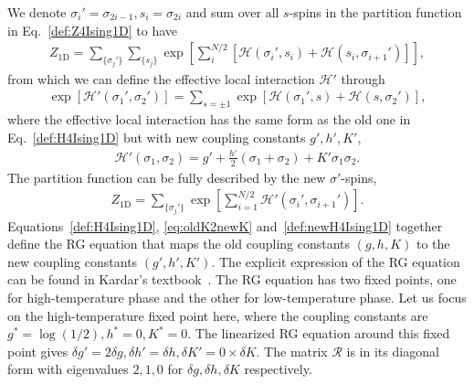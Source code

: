 \documentclass[aps,prb,reprint,superscriptaddress,floatfix]{revtex4-2}
\begin{document}
We denote $\sigma_i'=\sigma_{2i-1}, s_i = \sigma_{2i}$ and sum over all $s$-spins in the partition function in Eq.~\eqref{def:Z4Ising1D} to have
%
\begin{align}\label{eq:oldK2newKZ}
    Z_{\text{1D}} = 
    \sum_{\{\sigma_j'\}} \sum_{\{s_j \}}
    \exp{\left[ \sum_i^{N/2} \left[\mathscr{H}\left(\sigma_i',s_i\right)
    + \mathscr{H}\left(s_i,\sigma_{i+1}'\right)\right]\right]},
\end{align}
%
from which we can define the effective local interaction $\mathscr{H}'$ through
%
\begin{align}\label{eq:oldK2newK}
    \exp{\left[\mathscr{H}'\left(\sigma_1',\sigma_2'\right)\right]} =
    \sum_{s=\pm 1}\exp{\left[\mathscr{H}\left(\sigma_1',s\right) +
        \mathscr{H}\left(s,\sigma_2'\right)\right]},
\end{align}
%
where the effective local interaction has the same form as the old one in Eq.~\eqref{def:H4Ising1D} but with new coupling constants $g',h',K'$,
%
\begin{align}\label{def:newH4Ising1D}
    \mathscr{H}'\left(\sigma_1,\sigma_2\right) = g' +
    \frac{h'}{2}\left(\sigma_1 + \sigma_2\right) + K' \sigma_1 \sigma_2.
\end{align}
%
The partition function can be fully described by the new $\sigma'$-spins,
%
\begin{align}\label{eq:Z2Ising1Dnew}
    Z_{\text{1D}} = \sum_{\{\sigma_j'\}}
    \exp{\left[\sum_{i=1}^{N/2}\mathscr{H}'\left(\sigma_i',\sigma_{i+1}'\right)\right]}.
\end{align}
%
Equations~\eqref{def:H4Ising1D}, \eqref{eq:oldK2newK} and~\eqref{def:newH4Ising1D} together define the RG equation that maps the old coupling constants $(g,h,K)$ to the new coupling constants $(g',h',K')$. 
The explicit expression of the RG equation can be found in Kardar's textbook~\cite{kardar2007}. 
The RG equation has two fixed points, one for high-temperature phase and the other for low-temperature phase. 
Let us focus on the high-temperature fixed point here, where the coupling constants are $g^* = \log\left(1/2\right),h^*=0,K^*=0$. 
The linearized RG equation around this fixed point gives $\delta g' = 2\delta g, \delta h' = \delta h, \delta K' = 0\times \delta K$. 
The matrix $\mathcal{R}$ is in its diagonal form with eigenvalues $2,1,0$ for $\delta g,\delta h,\delta K$ respectively.
%
\end{document}
